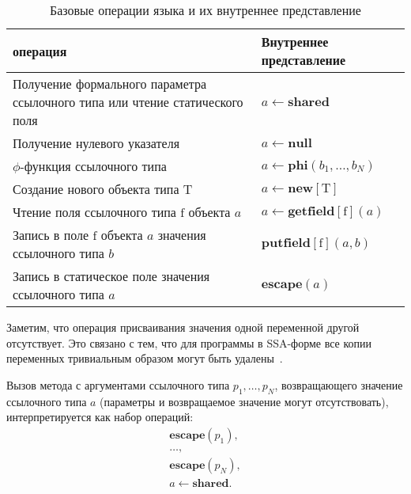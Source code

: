\documentclass[14pt,titlepage,draft]{extarticle}
\newcommand{\java}{\eng{Java}\xspace}
\let\mathphi\phi
\renewcommand{\phi}{\ensuremath{\mathphi}}
\newcommand{\type}[1]{\mathrm{#1}}
\newcommand{\field}[1]{\mathrm{#1}}
\newcommand{\op}[1]{\mathbf{#1}}
\begin{document}
    \begin{table}[htb]
      \centering

      \begin{tabular}{|p{}|p{}|}\hline
        \textbf{\java операция} &
          \textbf{Внутреннее представление}\\ \hline

        Получение формального параметра ссылочного типа или
        чтение статического поля
        & $a \gets \op{shared}$
        \\ \hline

        Получение нулевого указателя
        & $a \gets \op{null}$
        \\ \hline

        \phi-функция ссылочного типа
        & $a \gets \op{phi}(b_1, \ldots, b_N)$
        \\ \hline

        Создание нового объекта типа $\type{T}$
        & $a \gets \op{new}[\type{T}]$
        \\ \hline

        Чтение поля ссылочного типа $\field{f}$ объекта $a$
        & $a \gets \op{getfield}[\field{f}](a)$
        \\ \hline

        Запись в поле $\field{f}$ объекта $a$ значения ссылочного типа $b$
        & $\op{putfield}[\field{f}](a, b)$
        \\ \hline

        Запись в статическое поле значения ссылочного типа $a$
        & $\op{escape}(a)$
        \\ \hline

      \end{tabular}
      \caption{Базовые операции языка \java и их внутреннее представление}
      \label{tabular:basic_operations}
    \end{table}

    Заметим, что операция присваивания значения одной переменной другой
    отсутствует.
    Это связано с тем, что для программы в SSA-форме все копии переменных
    тривиальным образом могут быть удалены~\cite{ssa}.

    Вызов метода с аргументами ссылочного типа $p_1, \ldots, p_N$, возвращающего
    значение ссылочного типа $a$ (параметры и возвращаемое значение могут
    отсутствовать), интерпретируется как набор операций:
    \begin{gather*}
      \op{escape}(p_1), \\
      \ldots, \\
      \op{escape}(p_N), \\
      a \gets \op{shared}.
    \end{gather*}
\end{document}
